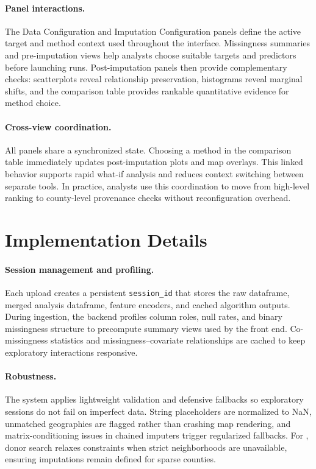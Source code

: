 \paragraph*{Panel interactions.}
The Data Configuration and Imputation Configuration panels define the active target and method context used throughout the interface. Missingness summaries and pre-imputation views help analysts choose suitable targets and predictors before launching runs. Post-imputation panels then provide complementary checks: scatterplots reveal relationship preservation, histograms reveal marginal shifts, and the comparison table provides rankable quantitative evidence for method choice.

\paragraph*{Cross-view coordination.}
All panels share a synchronized state. Choosing a method in the comparison table immediately updates post-imputation plots and map overlays. This linked behavior supports rapid what-if analysis and reduces context switching between separate tools. In practice, analysts use this coordination to move from high-level ranking to county-level provenance checks without reconfiguration overhead.

\section{Implementation Details}
\paragraph*{Session management and profiling.}
Each upload creates a persistent \texttt{session\_id} that stores the raw dataframe, merged analysis dataframe, feature encoders, and cached algorithm outputs. During ingestion, the backend profiles column roles, null rates, and binary missingness structure to precompute summary views used by the front end. Co-missingness statistics and missingness--covariate relationships are cached to keep exploratory interactions responsive.

\paragraph*{Robustness.}
The system applies lightweight validation and defensive fallbacks so exploratory sessions do not fail on imperfect data. String placeholders are normalized to NaN, unmatched geographies are flagged rather than crashing map rendering, and matrix-conditioning issues in chained imputers trigger regularized fallbacks. For \gknn, donor search relaxes constraints when strict neighborhoods are unavailable, ensuring imputations remain defined for sparse counties.

